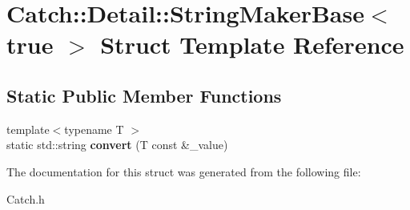 \hypertarget{struct_catch_1_1_detail_1_1_string_maker_base_3_01true_01_4}{\section{Catch\-:\-:Detail\-:\-:String\-Maker\-Base$<$ true $>$ Struct Template Reference}
\label{struct_catch_1_1_detail_1_1_string_maker_base_3_01true_01_4}
}
\subsection*{Static Public Member Functions}
\begin{DoxyCompactItemize}
\item 
\hypertarget{struct_catch_1_1_detail_1_1_string_maker_base_3_01true_01_4_af9b5fdf7fddd8c5c873caa819e5f00f6}{{\footnotesize template$<$typename T $>$ }\\static std\-::string {\bfseries convert} (T const \&\-\_\-value)}\label{struct_catch_1_1_detail_1_1_string_maker_base_3_01true_01_4_af9b5fdf7fddd8c5c873caa819e5f00f6}

\end{DoxyCompactItemize}


The documentation for this struct was generated from the following file\-:\begin{DoxyCompactItemize}
\item 
Catch.\-h\end{DoxyCompactItemize}
